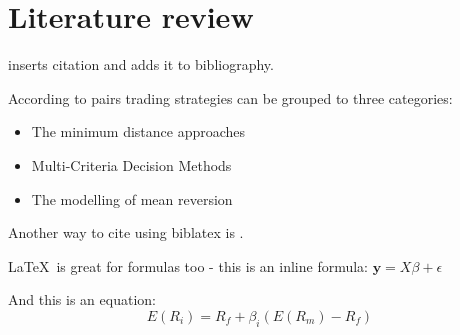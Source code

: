 \section{Literature review}

\cite{focardiNewApproachStatistical2016} inserts citation and adds it to bibliography. 

According to \cite{huckPairsTradingSelection2015} pairs trading strategies can be grouped to three categories:
\vspace{-5mm}
\begin{itemize}[noitemsep]
  \item The minimum distance approaches
  \item Multi-Criteria Decision Methods
  \item The modelling of mean reversion 
\end{itemize}


Another way to cite using biblatex is \parencite{huckPairsTradingOutranking2010}. 


\LaTeX \ is great for formulas too - this is an inline formula: $\textbf{y} = X\beta  + \epsilon $

And this is an equation: \\
\begin{equation}
  E(R_i) =  R_f + \beta_i (E(R_m) - R_f)
\end{equation}